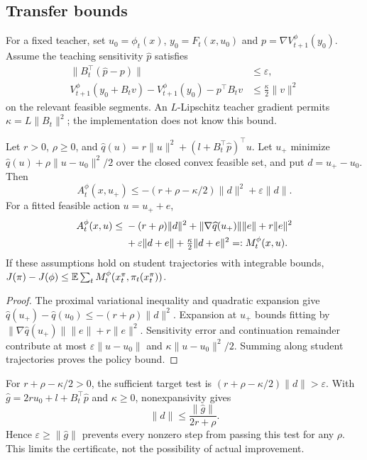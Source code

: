 \subsection{Transfer bounds}
For a fixed teacher, set $u_0=\phi_t(x)$, $y_0=F_t(x,u_0)$ and
$p=\nabla V_{t+1}^\phi(y_0)$. Assume the teaching sensitivity
$\widehat p$ satisfies
\begin{align}
 \|B_t^\top(\widehat p-p)\|&\leq\varepsilon,\\
 V_{t+1}^\phi(y_0+B_tv)-V_{t+1}^\phi(y_0)-p^\top B_tv
 &\leq\tfrac\kappa2\|v\|^2
\end{align}
on the relevant feasible segments. An $L$-Lipschitz teacher gradient
permits $\kappa=L\|B_t\|^2$; the implementation does not know this bound.

\begin{proposition}
Let $r>0$, $\rho\geq0$, and
$\widehat q(u)=r\|u\|^2+(l+B_t^\top\widehat p)^\top u$.
Let $u_+$ minimize $\widehat q(u)+\rho\|u-u_0\|^2/2$ over the closed
convex feasible set, and put $d=u_+-u_0$. Then
\begin{equation}\label{eq:impact-target}
 A_t^\phi(x,u_+)\leq-(r+\rho-\kappa/2)\|d\|^2+\varepsilon\|d\|.
\end{equation}
For a fitted feasible action $u=u_++e$,
\begin{align}\label{eq:impact-fitted}
 A_t^\phi(x,u)\leq{}&-(r+\rho)\|d\|^2
 +\|\nabla\widehat q(u_+)\|\|e\|+r\|e\|^2\notag\\
 &+\varepsilon\|d+e\|+\tfrac\kappa2\|d+e\|^2
 =:M_t^\phi(x,u).
\end{align}
If these assumptions hold on student trajectories with integrable bounds,
$J(\pi)-J(\phi)\leq\mathbb E\sum_tM_t^\phi(x_t^\pi,\pi_t(x_t^\pi))$.
\end{proposition}
\begin{proof}
The proximal variational inequality and quadratic expansion give
$\widehat q(u_+)-\widehat q(u_0)\leq-(r+\rho)\|d\|^2$.
Expansion at $u_+$ bounds fitting by
$\|\nabla\widehat q(u_+)\|\|e\|+r\|e\|^2$.
Sensitivity error and continuation remainder contribute at most
$\varepsilon\|u-u_0\|$ and $\kappa\|u-u_0\|^2/2$.
Summing along student trajectories proves the policy bound.
\end{proof}

For $r+\rho-\kappa/2>0$, the sufficient target test is
$(r+\rho-\kappa/2)\|d\|>\varepsilon$. With
$\widehat g=2ru_0+l+B_t^\top\widehat p$ and $\kappa\geq0$,
nonexpansivity gives
\begin{equation}
 \|d\|\leq\frac{\|\widehat g\|}{2r+\rho}.
\end{equation}
Hence $\varepsilon\geq\|\widehat g\|$ prevents every nonzero step
from passing this test for any $\rho$. This limits the certificate,
not the possibility of actual improvement.

